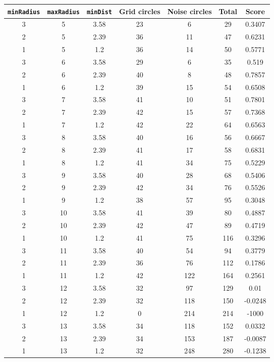 \documentclass[letterpaper, 12pt]{article}
\begin{document}
\begin{longtable}{|c|c|c|c|c|c|c|}
\hline
\textbf{\texttt{minRadius}} & \textbf{\texttt{maxRadius}} & \textbf{\texttt{minDist}} & \textbf{Grid circles} & \textbf{Noise circles} & \textbf{Total} & \textbf{Score} \\
\hline
3 & 5 & 3.58 & 23 & 6 & 29 & 0.3407 \\
\hline
2 & 5 & 2.39 & 36 & 11 & 47 & 0.6231 \\
\hline
1 & 5 & 1.2 & 36 & 14 & 50 & 0.5771 \\
\hline
3 & 6 & 3.58 & 29 & 6 & 35 & 0.519 \\
\hline
2 & 6 & 2.39 & 40 & 8 & 48 & 0.7857 \\
\hline
1 & 6 & 1.2 & 39 & 15 & 54 & 0.6508 \\
\hline
3 & 7 & 3.58 & 41 & 10 & 51 & 0.7801 \\
\hline
2 & 7 & 2.39 & 42 & 15 & 57 & 0.7368 \\
\hline
1 & 7 & 1.2 & 42 & 22 & 64 & 0.6563 \\
\hline
3 & 8 & 3.58 & 40 & 16 & 56 & 0.6667 \\
\hline
2 & 8 & 2.39 & 41 & 17 & 58 & 0.6831 \\
\hline
1 & 8 & 1.2 & 41 & 34 & 75 & 0.5229 \\
\hline
3 & 9 & 3.58 & 40 & 28 & 68 & 0.5406 \\
\hline
2 & 9 & 2.39 & 42 & 34 & 76 & 0.5526 \\
\hline
1 & 9 & 1.2 & 38 & 57 & 95 & 0.3048 \\
\hline
3 & 10 & 3.58 & 41 & 39 & 80 & 0.4887 \\
\hline
2 & 10 & 2.39 & 42 & 47 & 89 & 0.4719 \\
\hline
1 & 10 & 1.2 & 41 & 75 & 116 & 0.3296 \\
\hline
3 & 11 & 3.58 & 40 & 54 & 94 & 0.3779 \\
\hline
2 & 11 & 2.39 & 36 & 76 & 112 & 0.1786 \\
\hline
1 & 11 & 1.2 & 42 & 122 & 164 & 0.2561 \\
\hline
3 & 12 & 3.58 & 32 & 97 & 129 & 0.01 \\
\hline
2 & 12 & 2.39 & 32 & 118 & 150 & -0.0248 \\
\hline
1 & 12 & 1.2 & 0 & 214 & 214 & -1000 \\
\hline
3 & 13 & 3.58 & 34 & 118 & 152 & 0.0332 \\
\hline
2 & 13 & 2.39 & 34 & 153 & 187 & -0.0087 \\
\hline
1 & 13 & 1.2 & 32 & 248 & 280 & -0.1238 \\

\end{longtable}
\end{document}

